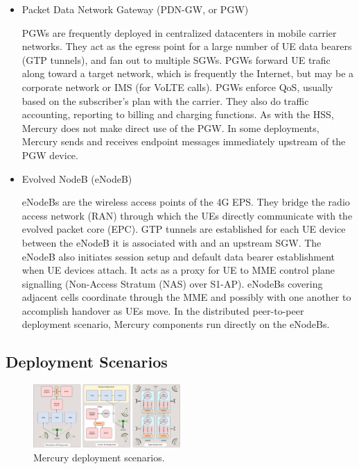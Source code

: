 \begin{itemize}
\item Packet Data Network Gateway (PDN-GW, or PGW)

PGWs are frequently deployed in centralized datacenters in mobile
carrier networks.  They act as the egress point for a large number of
UE data bearers (GTP tunnels), and fan out to multiple SGWs. PGWs
forward UE trafic along toward a target network, which is frequently
the Internet, but may be a corporate network or IMS (for VoLTE
calls). PGWs enforce QoS, usually based on the subscriber's plan with
the carrier. They also do traffic accounting, reporting to billing and
charging functions. As with the HSS, Mercury does not make direct use
of the PGW. In some deployments, Mercury sends and receives endpoint
messages immediately upstream of the PGW device.

\item Evolved NodeB (eNodeB)

eNodeBs are the wireless access points of the 4G EPS. They bridge the
radio access network (RAN) through which the UEs directly communicate
with the evolved packet core (EPC). GTP tunnels are established for
each UE device between the eNodeB it is associated with and an
upstream SGW.  The eNodeB also initiates session setup and default
data bearer establishment when UE devices attach. It acts as a proxy
for UE to MME control plane signalling (Non-Access Stratum (NAS) over
S1-AP). eNodeBs covering adjacent cells coordinate through the MME and
possibly with one another to accomplish handover as UEs move. In the
distributed peer-to-peer deployment scenario, Mercury components run
directly on the eNodeBs.

\end{itemize}

\subsection{Deployment Scenarios}

\begin{figure}[ht]
  \begin{center}
    \includegraphics[width=0.5\textwidth]{figs/deploy.png}
    \caption{Mercury deployment scenarios.}
    \label{fig:deployments}
  \end{center}
\end{figure}

